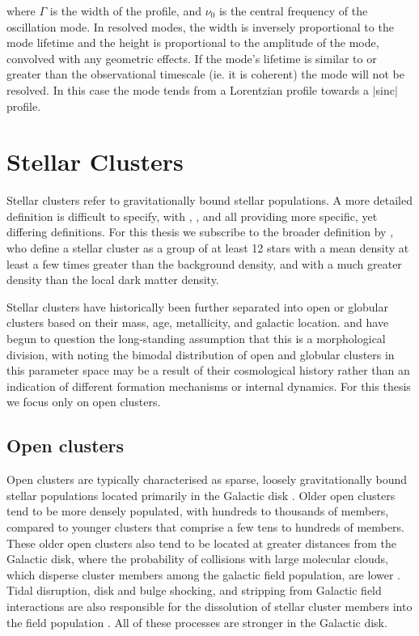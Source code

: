 \noindent where $\Gamma$ is the width of the profile, and $\nu_0$ is the central frequency of the oscillation mode. In resolved modes, the width is inversely proportional to the mode lifetime and the height is proportional to the amplitude of the mode, convolved with any geometric effects. If the mode's lifetime is similar to or greater than the observational timescale (ie. it is coherent) the mode will not be resolved. In this case the mode tends from a Lorentzian profile towards a $|$sinc$|$ profile.

\section{Stellar Clusters}

Stellar clusters refer to gravitationally bound stellar populations. A more detailed definition is difficult to specify, with \cite{lada_embedded_2003}, \cite{portegies_zwart_young_2010}, and \cite{mckee_stars_2015} all providing more specific, yet differing definitions. For this thesis we subscribe to the broader definition by \cite{krumholz_star_2019}, who define a stellar cluster as a group of at least 12 stars with a mean density at least a few times greater than the background density, and with a much greater density than the local dark matter density.

Stellar clusters have historically been further separated into open or globular clusters based on their mass, age, metallicity, and galactic location. \cite{kruijssen_globular_2014} and \cite{forbes_globular_2018} have begun to question the long-standing assumption that this is a morphological division, with \cite{krumholz_star_2019} noting the bimodal distribution of open and globular clusters in this parameter space may be a result of their cosmological history rather than an indication of different formation mechanisms or internal dynamics. For this thesis we focus only on open clusters.

\subsection{Open clusters}
\label{sect:litrev_ocs}
Open clusters are typically characterised as sparse, loosely gravitationally bound stellar populations located primarily in the Galactic disk \citep{van_den_bergh_galactic_1980,lynga_open_1982, friel_old_1995, dias_proper_2002, kharchenko_global_2013, cantat-gaudin_clusters_2020}. Older open clusters tend to be more densely populated, with hundreds to thousands of members, compared to younger clusters that comprise a few tens to hundreds of members. These older open clusters also tend to be located at greater distances from the Galactic disk, where the probability of collisions with large molecular clouds, which disperse cluster members among the galactic field population, are lower \cite[][and references therein]{gieles_star_2006}. %
Tidal disruption, disk and bulge shocking, and stripping from Galactic field interactions are also responsible for the dissolution of stellar cluster members into the field population \citep{marchi_search_2006}. All of these processes are stronger in the Galactic disk.%

